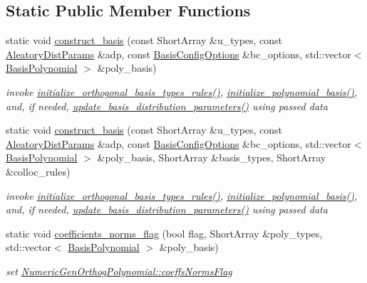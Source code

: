 \subsection*{Static Public Member Functions}
\begin{DoxyCompactItemize}
\item 
static void \hyperlink{classPecos_1_1SharedOrthogPolyApproxData_aa89044de171121ba6852986b1e308dc7}{construct\+\_\+basis} (const Short\+Array \&u\+\_\+types, const \hyperlink{classPecos_1_1AleatoryDistParams}{Aleatory\+Dist\+Params} \&adp, const \hyperlink{classPecos_1_1BasisConfigOptions}{Basis\+Config\+Options} \&bc\+\_\+options, std\+::vector$<$ \hyperlink{classPecos_1_1BasisPolynomial}{Basis\+Polynomial} $>$ \&poly\+\_\+basis)
\begin{DoxyCompactList}\small\item\em invoke \hyperlink{classPecos_1_1SharedPolyApproxData_a5c55db28633dec7b4247ae239a8667fc}{initialize\+\_\+orthogonal\+\_\+basis\+\_\+types\+\_\+rules()}, \hyperlink{classPecos_1_1SharedPolyApproxData_a9761a3bbd8c1737710737752432b533a}{initialize\+\_\+polynomial\+\_\+basis()}, and, if needed, \hyperlink{classPecos_1_1SharedPolyApproxData_a97e10bdee50a60499d893502e8294409}{update\+\_\+basis\+\_\+distribution\+\_\+parameters()} using passed data \end{DoxyCompactList}\item 
static void \hyperlink{classPecos_1_1SharedOrthogPolyApproxData_a99c558e3430c0c4d712e5512fef72954}{construct\+\_\+basis} (const Short\+Array \&u\+\_\+types, const \hyperlink{classPecos_1_1AleatoryDistParams}{Aleatory\+Dist\+Params} \&adp, const \hyperlink{classPecos_1_1BasisConfigOptions}{Basis\+Config\+Options} \&bc\+\_\+options, std\+::vector$<$ \hyperlink{classPecos_1_1BasisPolynomial}{Basis\+Polynomial} $>$ \&poly\+\_\+basis, Short\+Array \&basis\+\_\+types, Short\+Array \&colloc\+\_\+rules)
\begin{DoxyCompactList}\small\item\em invoke \hyperlink{classPecos_1_1SharedPolyApproxData_a5c55db28633dec7b4247ae239a8667fc}{initialize\+\_\+orthogonal\+\_\+basis\+\_\+types\+\_\+rules()}, \hyperlink{classPecos_1_1SharedPolyApproxData_a9761a3bbd8c1737710737752432b533a}{initialize\+\_\+polynomial\+\_\+basis()}, and, if needed, \hyperlink{classPecos_1_1SharedPolyApproxData_a97e10bdee50a60499d893502e8294409}{update\+\_\+basis\+\_\+distribution\+\_\+parameters()} using passed data \end{DoxyCompactList}\item 
static void \hyperlink{classPecos_1_1SharedOrthogPolyApproxData_addb932d873c18e78f747a02a1cccb3ac}{coefficients\+\_\+norms\+\_\+flag} (bool flag, Short\+Array \&poly\+\_\+types, std\+::vector$<$ \hyperlink{classPecos_1_1BasisPolynomial}{Basis\+Polynomial} $>$ \&poly\+\_\+basis)\label{classPecos_1_1SharedOrthogPolyApproxData_addb932d873c18e78f747a02a1cccb3ac}

\begin{DoxyCompactList}\small\item\em set \hyperlink{classPecos_1_1NumericGenOrthogPolynomial_a216f184d63de7370a1a674f4b1b7728d}{Numeric\+Gen\+Orthog\+Polynomial\+::coeffs\+Norms\+Flag} \end{DoxyCompactList}\end{DoxyCompactItemize}
